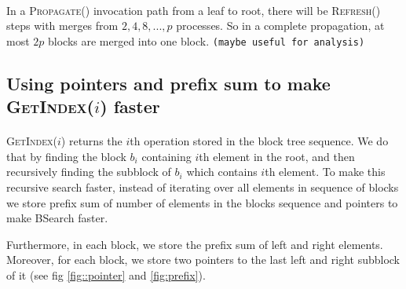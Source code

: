 \documentclass[10pt]{article}
\newtheorem{lemma}[theorem]{Lemma}
\theoremstyle{definition}
\newtheorem{definition}[theorem]{Definition}
\begin{document}
\paragraph{}
In a \textsc{Propagate}() invocation path from a leaf to root, there will be \textsc{Refresh}() steps with merges from $2, 4, 8, ..., p$ processes. So in a complete propagation, at most $2p$ blocks are merged into one block. \texttt{(maybe useful for analysis)}

\pagebreak
\subsection{Using pointers and prefix sum to make \textsc{GetIndex}($i$) faster}
\paragraph{}
\textsc{GetIndex}($i$) returns the $i$th operation stored in the block tree sequence. We do that by finding the block $b_i$ containing $i$th element in the root, and then recursively finding the subblock of $b_i$ which contains $i$th element. To make this recursive search faster, instead of iterating over all elements in sequence of blocks we store prefix sum of number of elements in the blocks sequence and pointers to make BSearch faster.

Furthermore, in each block, we store the prefix sum of left and right elements. Moreover, for each block, we store two pointers to the last left and right subblock of it (see fig \ref{fig::pointer} and \ref{fig:prefix}).
\end{document}
